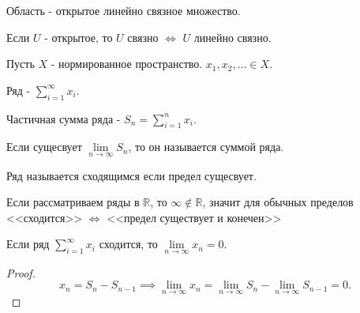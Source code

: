 \begin{definition} \thmslashn 

    Область - открытое линейно связное множество.
\end{definition}
\begin{remark} \thmslashn

    Если $U$ - открытое, то $U$ связно $\iff $ $U$ линейно связно.
\end{remark}
\begin{definition} \thmslashn 

    Пусть $X$ - нормированное пространство. $x_1, x_2, \ldots\in X$.

    Ряд - $\sum\limits_{i=1}^{\infty} x_{i}$.

    Частичная сумма ряда - $S_{n} = \sum\limits_{i=1}^{n} x_{i}$.

    Если сущесвует $\lim\limits_{n \to \infty} S_{n}$, то он называется суммой ряда.

    Ряд называется сходящимся если предел сущесвует.
\end{definition}
\begin{remark} \thmslashn

    Если рассматриваем ряды в $\mathbb{R}$, то $\infty \not\in \mathbb{R}$, значит для обычных пределов <<сходится>> $\iff$ <<предел существует и конечен>>
\end{remark}
\begin{theorem} \thmslashn

    Если ряд $\sum\limits_{i=1}^{\infty} x_{i}$ сходится, то $\lim\limits_{n \to \infty} x_{n} = 0$.

    \begin{proof} \thmslashn
    
        \[ x_{n} = S_{n} - S_{n-1} \implies \lim\limits_{n \to \infty} x_{n} = \lim\limits_{n \to \infty} S_{n} - \lim\limits_{n \to \infty} S_{n-1} = 0 .\] 
    \end{proof}
\end{theorem}
